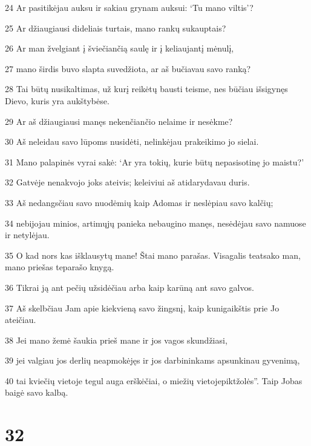 \par 24 Ar pasitikėjau auksu ir sakiau grynam auksui: ‘Tu mano viltis’? 
\par 25 Ar džiaugiausi dideliais turtais, mano rankų sukauptais? 
\par 26 Ar man žvelgiant į šviečiančią saulę ir į keliaujantį mėnulį, 
\par 27 mano širdis buvo slapta suvedžiota, ar aš bučiavau savo ranką? 
\par 28 Tai būtų nusikaltimas, už kurį reikėtų bausti teisme, nes būčiau išsigynęs Dievo, kuris yra aukštybėse. 
\par 29 Ar aš džiaugiausi manęs nekenčiančio nelaime ir nesėkme? 
\par 30 Aš neleidau savo lūpoms nusidėti, nelinkėjau prakeikimo jo sielai. 
\par 31 Mano palapinės vyrai sakė: ‘Ar yra tokių, kurie būtų nepasisotinę jo maistu?’ 
\par 32 Gatvėje nenakvojo joks ateivis; keleiviui aš atidarydavau duris. 
\par 33 Aš nedangsčiau savo nuodėmių kaip Adomas ir neslėpiau savo kalčių; 
\par 34 nebijojau minios, artimųjų panieka nebaugino manęs, nesėdėjau savo namuose ir netylėjau. 
\par 35 O kad nors kas išklausytų mane! Štai mano parašas. Visagalis teatsako man, mano priešas teparašo knygą. 
\par 36 Tikrai ją ant pečių užsidėčiau arba kaip karūną ant savo galvos. 
\par 37 Aš skelbčiau Jam apie kiekvieną savo žingsnį, kaip kunigaikštis prie Jo ateičiau. 
\par 38 Jei mano žemė šaukia prieš mane ir jos vagos skundžiasi, 
\par 39 jei valgiau jos derlių neapmokėjęs ir jos darbininkams apsunkinau gyvenimą, 
\par 40 tai kviečių vietoje tegul auga erškėčiai, o miežių vietoje­piktžolės”. Taip Jobas baigė savo kalbą.



\chapter{32}


